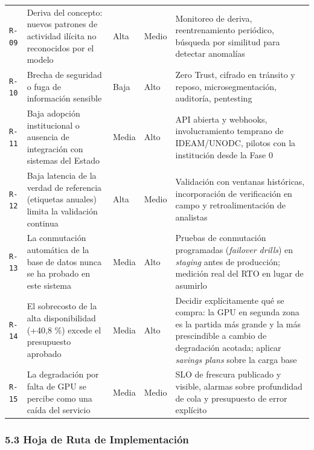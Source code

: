 \documentclass{article}
\begin{document}
{\begin{longtable}{@{}L{0.40in}L{1.65in}L{0.80in}L{0.47in}L{2.49in}@{}}
\texttt{R-\allowbreak{}09} & Deriva del concepto: nuevos patrones de actividad ilícita no reconocidos por el modelo & Alta & Medio & Monitoreo de deriva, reentrenamiento periódico, búsqueda por similitud para detectar anomalías \\
\texttt{R-\allowbreak{}10} & Brecha de seguridad o fuga de información sensible & Baja & Alto & Zero Trust, cifrado en tránsito y reposo, microsegmentación, auditoría, pentesting \\
\texttt{R-\allowbreak{}11} & Baja adopción institucional o ausencia de integración con sistemas del Estado & Media & Alto & API abierta y webhooks, involucramiento temprano de IDEAM/UNODC, pilotos con la institución desde la Fase 0 \\
\texttt{R-\allowbreak{}12} & Baja latencia de la verdad de referencia (etiquetas anuales) limita la validación continua & Alta & Medio & Validación con ventanas históricas, incorporación de verificación en campo y retroalimentación de analistas \\
\texttt{R-\allowbreak{}13} & La conmutación automática de la base de datos nunca se ha probado en este sistema & Media & Alto & Pruebas de conmutación programadas (\emph{failover drills}) en \emph{staging} antes de producción; medición real del RTO en lugar de asumirlo \\
\texttt{R-\allowbreak{}14} & El sobrecosto de la alta disponibilidad (+40,8 \%) excede el presupuesto aprobado & Media & Alto & Decidir explícitamente qué se compra: la GPU en segunda zona es la partida más grande y la más prescindible a cambio de degradación acotada; aplicar \emph{savings plans} sobre la carga base \\
\texttt{R-\allowbreak{}15} & La degradación por falta de GPU se percibe como una caída del servicio & Media & Medio & SLO de frescura publicado y visible, alarmas sobre profundidad de cola y presupuesto de error explícito \\
\end{longtable}
}

\subsubsection{5.3 Hoja de Ruta de Implementación}
\end{document}
